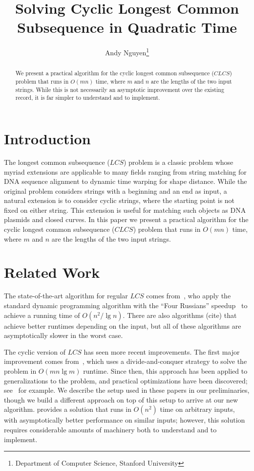 \documentclass{article}
\title{Solving Cyclic Longest Common Subsequence in Quadratic Time}
\author{Andy Nguyen\thanks{Department of Computer Science, Stanford University}}
\begin{document}

\maketitle

\begin{abstract}
We present a practical algorithm for the cyclic longest common subsequence ($CLCS$) problem that runs in $O(mn)$ time, where $m$ and $n$ are the lengths of the two input strings.  While this is not necessarily an asymptotic improvement over the existing record, it is far simpler to understand and to implement.
\end{abstract}

\section{Introduction}
The longest common subsequence ($LCS$) problem is a classic problem whose myriad extensions are applicable to many fields ranging from string matching for DNA sequence alignment to dynamic time warping for shape distance.  While the original problem considers strings with a beginning and an end as input, a natural extension is to consider cyclic strings, where the starting point is not fixed on either string.  This extension is useful for matching such objects as DNA plasmids and closed curves.  In this paper we present a practical algorithm for the cyclic longest common subsequence ($CLCS$) problem that runs in $O(mn)$ time, where $m$ and $n$ are the lengths of the two input strings.

\section{Related Work}
The state-of-the-art algorithm for regular $LCS$ comes from~\cite{MP80}, who apply the standard dynamic programming algorithm with the ``Four Russians'' speedup~\cite{ADKF70} to achieve a running time of $O(n^2 / \lg n)$.  There are also algorithms (cite) that achieve better runtimes depending on the input, but all of these algorithms are asymptotically slower in the worst case.

The cyclic version of $LCS$ has seen more recent improvements.  The first major improvement comes from~\cite{M90}, which uses a divide-and-conquer strategy to solve the problem in $O(mn \lg m)$ runtime.  Since then, this approach has been applied to generalizations to the problem, and practical optimizations have been discovered; see~\cite{SFC07} for example.  We describe the setup used in these papers in our preliminaries, though we build a different approach on top of this setup to arrive at our new algorithm. \cite{LMS98} provides a solution that runs in $O(n^2)$ time on arbitrary inputs, with asymptotically better performance on similar inputs; however, this solution requires considerable amounts of machinery both to understand and to implement.
\end{document}
